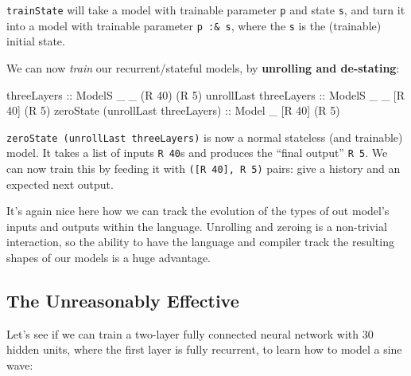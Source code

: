 \documentclass[]{article}
\newenvironment{Shaded}{}{}
\newcommand{\DataTypeTok}[1]{\textcolor[rgb]{0.56,0.13,0.00}{#1}}
\newcommand{\DecValTok}[1]{\textcolor[rgb]{0.25,0.63,0.44}{#1}}
\newcommand{\NormalTok}[1]{#1}
\newcommand{\OtherTok}[1]{\textcolor[rgb]{0.00,0.44,0.13}{#1}}
\begin{document}
\texttt{trainState} will take a model with trainable parameter \texttt{p} and
state \texttt{s}, and turn it into a model with trainable parameter
\texttt{p\ :\&\ s}, where the \texttt{s} is the (trainable) initial state.

We can now \emph{train} our recurrent/stateful models, by \textbf{unrolling and
de-stating}:

\begin{Shaded}
\begin{Highlighting}[]
\OtherTok{threeLayers                        ::} \DataTypeTok{ModelS}\NormalTok{ \_ \_ (}\DataTypeTok{R} \DecValTok{40}\NormalTok{) (}\DataTypeTok{R} \DecValTok{5}\NormalTok{)}
\NormalTok{unrollLast}\OtherTok{ threeLayers             ::} \DataTypeTok{ModelS}\NormalTok{ \_ \_ [}\DataTypeTok{R} \DecValTok{40}\NormalTok{] (}\DataTypeTok{R} \DecValTok{5}\NormalTok{)}
\NormalTok{zeroState (unrollLast threeLayers)}\OtherTok{ ::} \DataTypeTok{Model}\NormalTok{  \_   [}\DataTypeTok{R} \DecValTok{40}\NormalTok{] (}\DataTypeTok{R} \DecValTok{5}\NormalTok{)}
\end{Highlighting}
\end{Shaded}

\texttt{zeroState\ (unrollLast\ threeLayers)} is now a normal stateless (and
trainable) model. It takes a list of inputs \texttt{R\ 40}s and produces the
``final output'' \texttt{R\ 5}. We can now train this by feeding it with
\texttt{({[}R\ 40{]},\ R\ 5)} pairs: give a history and an expected next output.

It's again nice here how we can track the evolution of the types of out model's
inputs and outputs within the language. Unrolling and zeroing is a non-trivial
interaction, so the ability to have the language and compiler track the
resulting shapes of our models is a huge advantage.

\subsection{The Unreasonably Effective}\label{the-unreasonably-effective}

Let's see if we can train a two-layer fully connected neural network with 30
hidden units, where the first layer is fully recurrent, to learn how to model a
sine wave:
\end{document}
